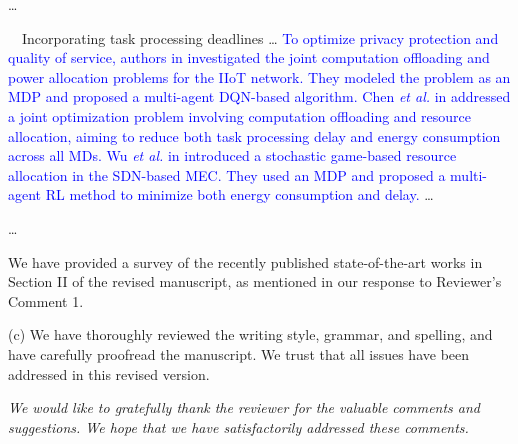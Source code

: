 \documentclass[12pt,draftclsnofoot,onecolumn]{IEEEtran}
\newenvironment{my}[2]%
{\begin{list}{}%
{\setlength{\rightmargin}{#1}\setlength{\leftmargin}{#2}}%


 \item[]{}

} {\end{list}}
\begin{document}
\begin{enumerate}
\begin{my}{1cm}{1cm}
{{\dots

\,\,\,\,
Incorporating task processing deadlines \dots
\textcolor{blue}{ To optimize privacy protection and quality of service, authors in \cite{wu2024privacy} investigated the joint computation offloading and power allocation problems for the IIoT network. They modeled the problem as an MDP and proposed a multi-agent DQN-based algorithm. }
\textcolor{blue}{ Chen \textit{et al.} in \cite{chen2021drl} addressed a joint optimization problem involving computation offloading and resource allocation, aiming to reduce both task processing delay and energy consumption across all MDs.
Wu \textit{et al.} in \cite{wu2023computation} introduced a stochastic game-based resource allocation in the SDN-based MEC. They used an MDP and proposed a multi-agent RL method to minimize both energy consumption and delay.} \dots

\dots


	
	
}}
\end{my}\vspace{6mm}

We have provided a survey of the recently published state-of-the-art works in Section II of the revised manuscript, as mentioned in our response to Reviewer's Comment 1.\newline

(c) We have thoroughly reviewed the writing style, grammar, and spelling, and have carefully proofread the manuscript. We trust that all issues have been addressed in this revised version. 

\vspace{10mm}



\end{enumerate}

\textit{We would like to gratefully thank the reviewer for the valuable comments and suggestions. We hope that we have satisfactorily addressed these comments.}\newline




	\setcounter{section}{1}
\setcounter{table}{0}
\end{document}
